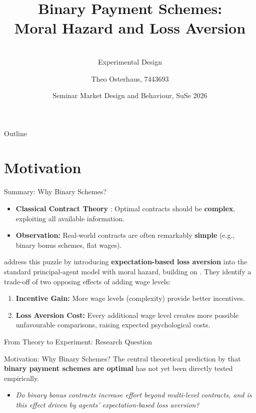 \documentclass{beamer}
\title[Binary Payment Schemes]{Binary Payment Schemes: \\ Moral Hazard and Loss Aversion}
\subtitle{\cite{Herweg2010} \\ Experimental Design}
\author[Theo Osterhaus]{Theo Osterhaus, 7443693}
\date[June 2026]{Seminar Market Design and Behaviour, SuSe 2026}
\institute[WiSo Faculty]{Faculty of Management, Economics and Social Sciences \\ Universität zu Köln}
\begin{document}
\frame{\titlepage}

\begin{frame}{Outline}
    \tableofcontents
\end{frame}

\section{Motivation}

\begin{frame}{Summary: Why Binary Schemes?}
    \begin{itemize}
        \item \textbf{Classical Contract Theory} \parencite{Holmstroem1979}: Optimal contracts should be \textbf{complex}, exploiting all available information.
        \item \textbf{Observation:} Real-world contracts are often remarkably \textbf{simple} (e.g., binary bonus schemes, flat wages).
    \end{itemize}

    \medskip
    
    \textcite{Herweg2010} address this puzzle by introducing \textbf{expectation-based loss aversion} into the standard principal-agent model with moral hazard, building on \textcite{koszegi2007}.
    They identify a trade-off of two opposing effects of adding wage levels:
        
        \medskip
        
        \begin{enumerate}
            \item \textbf{Incentive Gain:} More wage levels (complexity) provide better incentives.
            \item \textbf{Loss Aversion Cost:}  Every additional wage level creates more possible unfavourable comparisons, raising expected psychological costs.
        \end{enumerate}
    \end{frame}
    

\begin{frame}{From Theory to Experiment: Research Question}

    \begin{block}{Motivation: Why Binary Schemes?}
        The central theoretical prediction by \textcite{Herweg2010} that \textbf{binary payment schemes are optimal} has not yet been directly tested empirically.
    \end{block}

    \vspace{0.4cm}
    
    \begin{itemize}
        \item[] \Large \textit{Do binary bonus contracts increase effort beyond multi-level contracts, and is this effect driven by agents' expectation-based loss aversion?}
    \end{itemize}
 
\end{frame}
\end{document}
